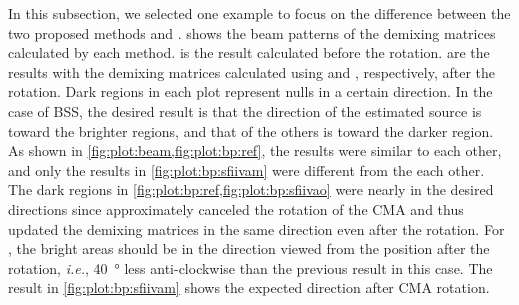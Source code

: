 \documentclass[sip,biber]{now-journal}
\begin{document}
In this subsection, we selected one example to focus on the difference between the two proposed methods \SFIIVAo{} and \SFIIVAm{}.
 shows the beam patterns of the demixing matrices calculated by each method.
 is the result calculated before the rotation.
 are the results with the demixing matrices calculated using \SFIIVAo{} and \SFIIVAm{}, respectively, after the rotation.
Dark regions in each plot represent nulls in a certain direction.
In the case of BSS, the desired result is that the direction of the estimated source is toward the brighter regions, and that of the others is toward the darker region.
As shown in \cref{fig:plot:beam,fig:plot:bp:ref}, the results were similar to each other, and only the results in \cref{fig:plot:bp:sfiivam} were different from the each other.
The dark regions in \cref{fig:plot:bp:ref,fig:plot:bp:sfiivao} were nearly in the desired directions since \SFIIVAo{} approximately canceled the rotation of the CMA and thus updated the demixing matrices in the same direction even after the rotation.
For \SFIIVAm{}, the bright areas should be in the direction viewed from the position after the rotation, \emph{i.e.}, \SI{40}{\degree} less anti-clockwise than the previous result in this case.
The result in \cref{fig:plot:bp:sfiivam} shows the expected direction after CMA rotation.
\end{document}
